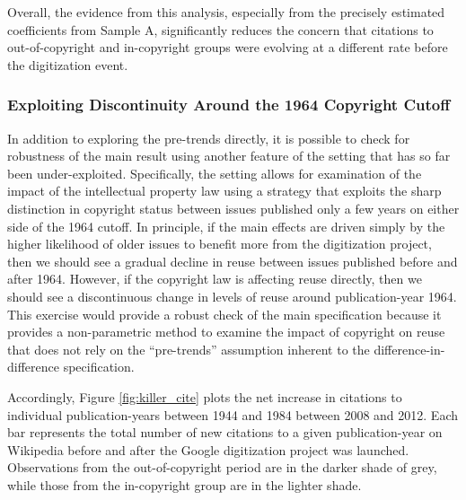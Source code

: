 \documentclass[11pt]{article}
\begin{document}
Overall, the evidence from this analysis, especially from the precisely estimated coefficients from Sample A, significantly reduces the concern that citations to out-of-copyright and in-copyright groups were evolving at a different rate before the digitization event.

\subsubsection{Exploiting Discontinuity Around the 1964 Copyright Cutoff}

In addition to exploring the pre-trends directly, it is possible to check for robustness of the main result using another feature of the setting that has so far been under-exploited. Specifically, the setting allows for examination of the impact of the intellectual property law using a strategy that exploits the sharp distinction in copyright status between issues published only a few years on either side of the 1964 cutoff. In principle, if the main effects are driven simply by the higher likelihood of older issues to benefit more from the digitization project, then we should see a gradual decline in reuse between issues published before and after 1964. However, if the copyright law is affecting reuse directly, then we should see a discontinuous change in levels of reuse around publication-year 1964. This exercise would provide a robust check of the main specification because it provides a non-parametric method to examine the impact of copyright on reuse that does not rely on the ``pre-trends'' assumption inherent to the difference-in-difference specification.

Accordingly, Figure \ref{fig:killer_cite} plots the net increase in citations to individual publication-years between 1944 and 1984 between 2008 and 2012. Each bar represents the total number of new citations to a given publication-year on Wikipedia before and after the Google digitization project was launched. Observations from the out-of-copyright period are in the darker shade of grey, while those from the in-copyright group are in the lighter shade.
\end{document}
